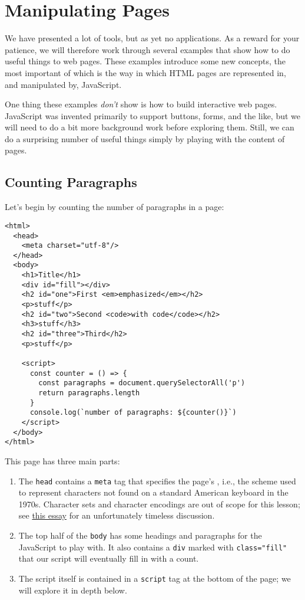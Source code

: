\chapter{Manipulating Pages}\label{s:pages}

We have presented a lot of tools, but as yet no applications.
As a reward for your patience,
we will therefore work through several examples that show
how to do useful things to web pages.
These examples introduce some new concepts,
the most important of which is the way in which HTML pages are represented in,
and manipulated by,
JavaScript.

One thing these examples \emph{don't} show is how to build interactive web pages.
JavaScript was invented primarily to support buttons, forms, and the like,
but we will need to do a bit more background work before exploring them.
Still,
we can do a surprising number of useful things
simply by playing with the content of pages.

\section{Counting Paragraphs}\label{s:pages-counting}

Let's begin by counting the number of paragraphs in a page:

\begin{verbatim}
<html>
  <head>
    <meta charset="utf-8"/>
  </head>
  <body>
    <h1>Title</h1>
    <div id="fill"></div>
    <h2 id="one">First <em>emphasized</em></h2>
    <p>stuff</p>
    <h2 id="two">Second <code>with code</code></h2>
    <h3>stuff</h3>
    <h2 id="three">Third</h2>
    <p>stuff</p>

    <script>
      const counter = () => {
        const paragraphs = document.querySelectorAll('p')
        return paragraphs.length
      }
      console.log(`number of paragraphs: ${counter()}`)
    </script>
  </body>
</html>
\end{verbatim}

This page has three main parts:

\begin{enumerate}
\item
  The \texttt{head} contains a \texttt{meta} tag that specifies the page's
  ,
  i.e.,
  the scheme used to represent characters
  not found on a standard American keyboard in the 1970s.
  Character sets and character encodings are out of scope for this lesson;
  see \href{https://www.joelonsoftware.com/2003/10/08/the-absolute-minimum-every-software-developer-absolutely-positively-must-know-about-unicode-and-character-sets-no-excuses/}{this essay} for an unfortunately timeless discussion.
\item
  The top half of the \texttt{body} has some headings and paragraphs
  for the JavaScript to play with.
  It also contains a \texttt{div} marked with \texttt{class="fill"}
  that our script will eventually fill in with a count.
\item
  The script itself is contained in a \texttt{script} tag at the bottom of the page;
  we will explore it in depth below.
\end{enumerate}

